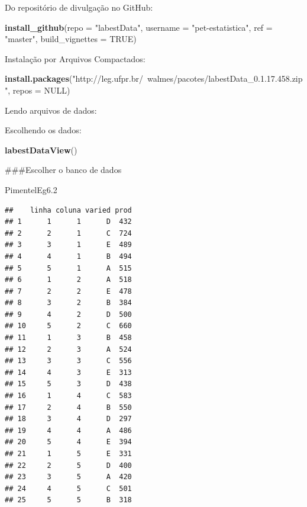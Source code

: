 \documentclass[
]{book}
\newenvironment{Shaded}{\begin{snugshade}}{\end{snugshade}}
\newcommand{\DataTypeTok}[1]{\textcolor[rgb]{0.13,0.29,0.53}{#1}}
\newcommand{\FloatTok}[1]{\textcolor[rgb]{0.00,0.00,0.81}{#1}}
\newcommand{\KeywordTok}[1]{\textcolor[rgb]{0.13,0.29,0.53}{\textbf{#1}}}
\newcommand{\NormalTok}[1]{#1}
\newcommand{\OtherTok}[1]{\textcolor[rgb]{0.56,0.35,0.01}{#1}}
\newcommand{\StringTok}[1]{\textcolor[rgb]{0.31,0.60,0.02}{#1}}
\begin{document}
Do repositório de divulgação no GitHub:

\begin{Shaded}
\begin{Highlighting}[]
\KeywordTok{install_github}\NormalTok{(}\DataTypeTok{repo =} \StringTok{"labestData"}\NormalTok{,}
               \DataTypeTok{username =} \StringTok{"pet-estatistica"}\NormalTok{,}
               \DataTypeTok{ref =} \StringTok{"master"}\NormalTok{, }\DataTypeTok{build_vignettes =} \OtherTok{TRUE}\NormalTok{)}
\end{Highlighting}
\end{Shaded}

Instalação por Arquivos Compactados:

\begin{Shaded}
\begin{Highlighting}[]
\KeywordTok{install.packages}\NormalTok{(}\StringTok{"http://leg.ufpr.br/~walmes/pacotes/labestData_0.1.17.458.zip"}\NormalTok{,}
  \DataTypeTok{repos =} \OtherTok{NULL}\NormalTok{)}
\end{Highlighting}
\end{Shaded}

Lendo arquivos de dados:

Escolhendo os dados:

\begin{Shaded}
\begin{Highlighting}[]
\KeywordTok{labestDataView}\NormalTok{()}
\end{Highlighting}
\end{Shaded}

\#\#\#Escolher o banco de dados

\begin{Shaded}
\begin{Highlighting}[]
\NormalTok{PimentelEg6}\FloatTok{.2}
\end{Highlighting}
\end{Shaded}

\begin{verbatim}
##    linha coluna varied prod
## 1      1      1      D  432
## 2      2      1      C  724
## 3      3      1      E  489
## 4      4      1      B  494
## 5      5      1      A  515
## 6      1      2      A  518
## 7      2      2      E  478
## 8      3      2      B  384
## 9      4      2      D  500
## 10     5      2      C  660
## 11     1      3      B  458
## 12     2      3      A  524
## 13     3      3      C  556
## 14     4      3      E  313
## 15     5      3      D  438
## 16     1      4      C  583
## 17     2      4      B  550
## 18     3      4      D  297
## 19     4      4      A  486
## 20     5      4      E  394
## 21     1      5      E  331
## 22     2      5      D  400
## 23     3      5      A  420
## 24     4      5      C  501
## 25     5      5      B  318
\end{verbatim}
\end{document}
